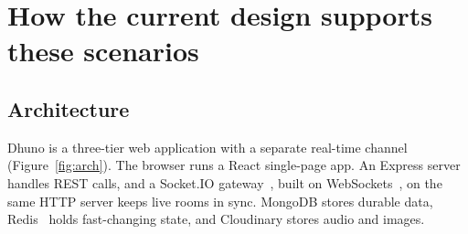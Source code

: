 \documentclass[11pt,a4paper]{article}
\begin{document}
\section{How the current design supports these scenarios}\label{sec:design}
\subsection{Architecture}
Dhuno is a three-tier web application with a separate real-time channel
(Figure~\ref{fig:arch}). The browser runs a React single-page app. An Express server
handles REST calls, and a Socket.IO gateway~\cite{socketio}, built on WebSockets~\cite{ws},
on the same HTTP server keeps live rooms in sync. MongoDB stores durable data, Redis~\cite{redis}
holds fast-changing state, and Cloudinary stores audio and images.
\end{document}
